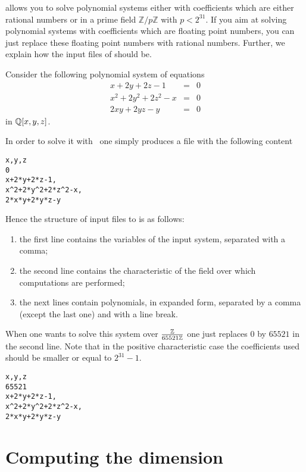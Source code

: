 \documentclass[a4paper,english,11pt]{scrartcl}
\theoremstyle{definition}
\theoremstyle{remark}
\begin{document}
\msolve allows you to solve polynomial systems either with coefficients
which are either rational numbers or in a prime field $\mathbb{Z}/p\mathbb{Z}$
with $p < 2^{31}$. If you aim at solving polynomial systems with coefficients
which are floating point numbers, you can just replace these floating point
numbers with rational numbers. Further, we explain how the input files of
\msolve should be.

Consider the following polynomial system of equations
\[
  \begin{array}{rcl}
    x+2 y+2 z-1 &= &0\\
    x^2+2 y^2+2 z^2-x &= &0\\
    2 x y+2 y z-y &= &0
  \end{array}
\]
in $\mathbb{Q}[x,y,z]$.

In order to solve it with \msolve~one simply produces a file with the following content
\begin{tcolorbox}
\begin{verbatim}
x,y,z
0
x+2*y+2*z-1,
x^2+2*y^2+2*z^2-x,
2*x*y+2*y*z-y
\end{verbatim}  
\end{tcolorbox}
Hence the structure of input files to \msolve is as follows:
\begin{enumerate}
\item the first line contains the variables of the input system, separated with
  a comma; 
\item the second line contains the characteristic of the field over which
  computations are performed; 
\item the next lines contain polynomials, in expanded form, separated by a comma
  (except the last one) and with a line break. 
\end{enumerate}



When one wants to solve this system over $\frac{\mathbb{Z}}{65521\mathbb{Z}}$ one just replaces
$0$ by $65521$ in the second line. Note that in the positive characteristic case
the coefficients used should be smaller or equal to $2^{31}-1$.

\begin{tcolorbox}
\begin{verbatim}
x,y,z
65521
x+2*y+2*z-1,
x^2+2*y^2+2*z^2-x,
2*x*y+2*y*z-y
\end{verbatim}  
\end{tcolorbox}

\section{Computing the dimension}\label{sec:dim}
\end{document}
